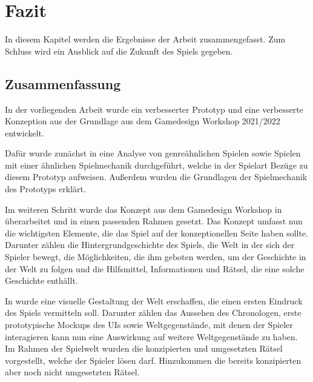 \chapter{Fazit}\label{sec:fazit}
In diesem Kapitel werden die Ergebnisse der Arbeit zusammengefasst. Zum Schluss wird ein Ausblick auf die Zukunft des Spiels gegeben.
\section{Zusammenfassung}
In der vorliegenden Arbeit wurde ein verbesserter Prototyp und eine verbesserte Konzeption aus der Grundlage aus dem Gamedesign Workshop 2021/2022 entwickelt. 

Dafür wurde zunächst in   eine Analyse von genreähnlichen Spielen sowie Spielen mit einer ähnlichen Spielmechanik durchgeführt, welche in der Spielart Bezüge zu diesem Prototyp aufweisen. Außerdem wurden die Grundlagen der Spielmechanik des Prototyps erklärt.

Im weiteren Schritt wurde das Konzept aus dem Gamedesign Workshop in  überarbeitet und in einen passenden Rahmen gesetzt. Das Konzept umfasst nun die wichtigsten Elemente, die das Spiel auf der konzeptionellen Seite haben sollte. Darunter zählen die Hintergrundgeschichte des Spiels, die Welt in der sich der Spieler bewegt, die Möglichkeiten, die ihm geboten werden, um der Geschichte in der Welt zu folgen und die Hilfsmittel, Informationen und Rätsel, die eine solche Geschichte enthällt.

In  wurde eine visuelle Gestaltung der Welt erschaffen, die einen ersten Eindruck des Spiels vermitteln soll. Darunter zählen das Aussehen des Chronologen, erste prototypische Mockups des \ac{UI}s sowie Weltgegenstände, mit denen der Spieler interagieren kann nun eine Auswirkung auf weitere Weltgegenstände zu haben. Im Rahmen der Spielwelt wurden die konzipierten und umgesetzten Rätsel vorgestellt, welche der Spieler lösen darf. Hinzukommen die bereits konzipierten aber noch nicht umgesetzten Rätsel. 


